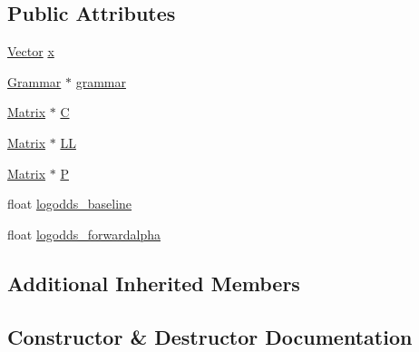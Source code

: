 \subsection*{Public Attributes}
\begin{DoxyCompactItemize}
\item 
\hyperlink{_eigen_numerics_8h_aca2956bc379bce2ed88ab3c0e1b61d1d}{Vector} \hyperlink{class_grammar_hypothesis_a27fdb926401378fc46373ee57bb2a21f}{x}
\item 
\hyperlink{class_grammar}{Grammar} $\ast$ \hyperlink{class_grammar_hypothesis_ae3aa5981689e75e3eccc343c838b8f47}{grammar}
\item 
\hyperlink{_eigen_numerics_8h_a645222978e81acfb2523a9bce34aecc0}{Matrix} $\ast$ \hyperlink{class_grammar_hypothesis_a2147efc4d1268e115803bd34f63f1c35}{C}
\item 
\hyperlink{_eigen_numerics_8h_a645222978e81acfb2523a9bce34aecc0}{Matrix} $\ast$ \hyperlink{class_grammar_hypothesis_a90aea1a98b122b01e7a10cc2c7c251d4}{LL}
\item 
\hyperlink{_eigen_numerics_8h_a645222978e81acfb2523a9bce34aecc0}{Matrix} $\ast$ \hyperlink{class_grammar_hypothesis_a7154fb0938913f01dfd85efb76c46250}{P}
\item 
float \hyperlink{class_grammar_hypothesis_a41985a24a133b009328deed14a2b8802}{logodds\+\_\+baseline}
\item 
float \hyperlink{class_grammar_hypothesis_a1027d3f52f4d1adddd923a18fb393955}{logodds\+\_\+forwardalpha}
\end{DoxyCompactItemize}
\subsection*{Additional Inherited Members}


\subsection{Constructor \& Destructor Documentation}
\mbox{\label{class_grammar_hypothesis_afd02b96535124c5e205ce7185c64c862}} 

